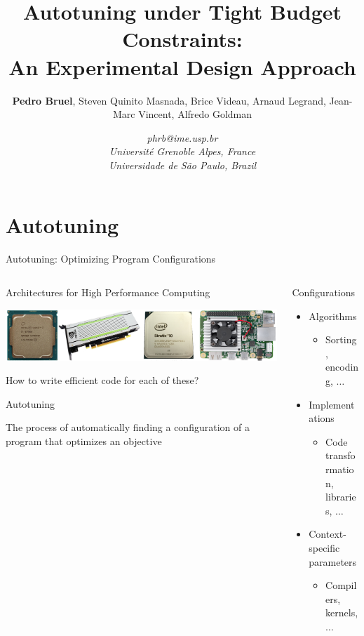 \documentclass[10pt, compress, aspectratio=169, xcolor={table,usenames,dvipsnames}]{beamer}
\author{ \footnotesize \textbf{\alert{Pedro Bruel}},  Steven Quinito Masnada, Brice Videau, Arnaud Legrand, Jean-Marc Vincent, Alfredo Goldman}
\date{ \scriptsize \textit{phrb@ime.usp.br} \\[1em] \textit{Université Grenoble Alpes, France} \\ \textit{Universidade de São Paulo, Brazil}}
\title{Autotuning under Tight Budget Constraints:  \\ An Experimental Design Approach}
\begin{document}
\maketitle

\section{Autotuning}
\label{sec:org4e6596b}
\begin{frame}[label={sec:orgcc55431}]{Autotuning: Optimizing Program Configurations}
\begin{columns}
\begin{column}{0.5\columnwidth}
\begin{block}{Architectures for High Performance Computing}
\begin{center}
\includegraphics[width=\columnwidth]{../../../img/architectures_2.png}
\end{center}

How to write \alert{efficient code} for each of these?

\begin{block}{Autotuning}
\vspace{.2cm}

The process of automatically finding a \mbox{\alert{configuration}} of a program
that optimizes an \mbox{\alert{objective}}
\end{block}
\end{block}
\end{column}

\begin{column}{0.5\columnwidth}
\begin{block}{Configurations}
\begin{itemize}
\item Algorithms
\begin{itemize}
\item Sorting, encoding, \(\dots\)
\end{itemize}
\item Implementations
\begin{itemize}
\item Code transformation, libraries, \(\dots\)
\end{itemize}
\item Context-specific parameters
\begin{itemize}
\item Compilers, kernels, \(\dots\)
\end{itemize}
\end{itemize}


\end{block}
\end{column}
\end{columns}
\end{frame}
\end{document}
